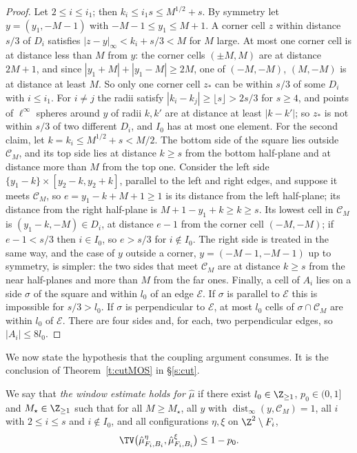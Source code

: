 \begin{proof}
Let $2 \le i \le i_1$; then $k_i \le i_1 s \le M^{1/2} + s$. By symmetry let $y = (y_1, -M - 1)$ with $-M - 1 \le y_1 \le M + 1$. A corner cell $z$ within distance $s/3$ of $D_i$ satisfies $|z - y|_\infty < k_i + s/3 < M$ for $M$ large. At most one corner cell is at distance less than $M$ from $y$: the corner cells $(\pm M, M)$ are at distance $2M + 1$, and since $|y_1 + M| + |y_1 - M| \ge 2M$, one of $(-M, -M)$, $(M, -M)$ is at distance at least $M$. So only one corner cell $z_*$ can be within $s/3$ of some $D_i$ with $i \le i_1$. For $i \neq j$ the radii satisfy $|k_i - k_j| \ge \lfloor s \rfloor > 2s/3$ for $s \ge 4$, and points of $\ell^\infty$ spheres around $y$ of radii $k, k'$ are at distance at least $|k - k'|$; so $z_*$ is not within $s/3$ of two different $D_i$, and $I_0$ has at most one element. For the second claim, let $k = k_i \le M^{1/2} + s < M/2$. The bottom side of the square lies outside $\mathcal C_M$, and its top side lies at distance $k \ge s$ from the bottom half-plane and at distance more than $M$ from the top one. Consider the left side $\{y_1 - k\} \times [y_2 - k, y_2 + k]$, parallel to the left and right edges, and suppose it meets $\mathcal C_M$, so $e = y_1 - k + M + 1 \ge 1$ is its distance from the left half-plane; its distance from the right half-plane is $M + 1 - y_1 + k \ge k \ge s$. Its lowest cell in $\mathcal C_M$ is $(y_1 - k, -M) \in D_i$, at distance $e - 1$ from the corner cell $(-M, -M)$; if $e - 1 < s/3$ then $i \in I_0$, so $e > s/3$ for $i \notin I_0$. The right side is treated in the same way, and the case of $y$ outside a corner, $y = (-M - 1, -M - 1)$ up to symmetry, is simpler: the two sides that meet $\mathcal C_M$ are at distance $k \ge s$ from the near half-planes and more than $M$ from the far ones. Finally, a cell of $A_i$ lies on a side $\sigma$ of the square and within $l_0$ of an edge $\mathcal E$. If $\sigma$ is parallel to $\mathcal E$ this is impossible for $s/3 > l_0$. If $\sigma$ is perpendicular to $\mathcal E$, at most $l_0$ cells of $\sigma \cap \mathcal C_M$ are within $l_0$ of $\mathcal E$. There are four sides and, for each, two perpendicular edges, so $|A_i| \le 8 l_0$.
\end{proof}

We now state the hypothesis that the coupling argument consumes. It is the conclusion of Theorem~\ref{t:cutMOS} in \S\ref{s:cut}.

\begin{definition}\label{d:W}
We say that \emph{the window estimate holds for $\hat\mu$} if there exist $l_0 \in \Z_{\ge1}$, $p_0 \in (0, 1]$ and $M_\star\in\Z_{\ge1}$ such that for all $M \ge M_\star$, all $y$ with $\operatorname{dist}_\infty(y, \mathcal C_M) = 1$, all $i$ with $2 \le i \le s$ and $i \notin I_0$, and all configurations $\eta, \xi$ on $\Z^2 \setminus F_i$,
\begin{equation}\label{e:W}
\TV\bigl( \hat\mu^\eta_{F_i, B_i}, \hat\mu^\xi_{F_i, B_i} \bigr) \le 1 - p_0 .
\end{equation}
\end{definition}

